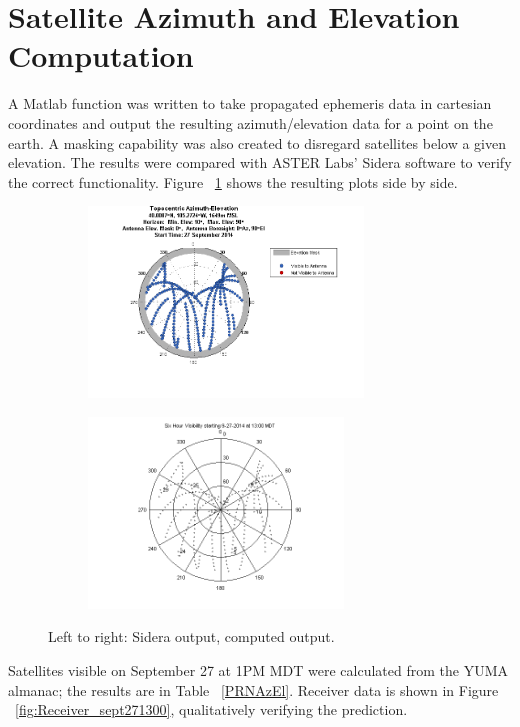 \documentclass[paper]{aiaaNew}
\begin{document}
\section{Satellite Azimuth and Elevation Computation}
A Matlab function was written to take propagated ephemeris data in cartesian coordinates and output the resulting azimuth/elevation data for a point on the earth.  A masking capability was also created to disregard satellites below a given elevation.  The results were compared with ASTER Labs' Sidera software to verify the correct functionality. Figure  ~\ref{fig:SideraVsMe} shows the resulting plots side by side.

\begin{figure}[H]
 	\centering
	\begin{subfigure}
	\centering
 		\includegraphics[height=2in]{Figures/PRN_Vis_201409271300MDT_6hr_Sidera}
	\end{subfigure}
	\begin{subfigure}
	\centering
 		\includegraphics[height=2in]{Figures/PRN_Vis_201409271300MDT_6hr}
	\end{subfigure}
 	\caption{Left to right: Sidera output, computed output.}
 	\label{fig:SideraVsMe}
 \end{figure}

Satellites visible on September 27 at 1PM MDT were calculated from the YUMA almanac; the results are in Table ~\ref{PRNAzEl}.  Receiver data is shown in Figure ~\ref{fig:Receiver_sept271300}, qualitatively verifying the prediction.
\end{document}
